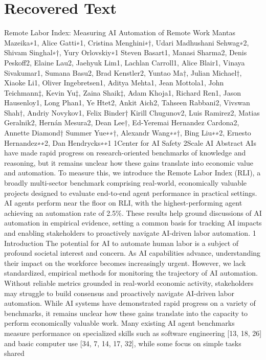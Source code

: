 \section{Recovered Text}
Remote Labor Index:
Measuring AI Automation of Remote Work
Mantas Mazeika∗1, Alice Gatti∗1, Cristina Menghini∗†,
Udari Madhushani Sehwag∗2, Shivam Singhal∗†, Yury Orlovskiy∗1
Steven Basart1, Manasi Sharma2, Denis Peskoff2, Elaine Lau2, Jaehyuk Lim1,
Lachlan Carroll1, Alice Blair1, Vinaya Sivakumar1, Sumana Basu2, Brad Kenstler2,
Yuntao Ma†, Julian Michael†, Xiaoke Li1, Oliver Ingebretsen1, Aditya Mehta1,
Jean Mottola1, John Teichmann‡, Kevin Yu‡, Zaina Shaik‡, Adam Khoja1,
Richard Ren1, Jason Hausenloy1, Long Phan1, Ye Htet2, Ankit Aich2,
Tahseen Rabbani2, Vivswan Shah†, Andriy Novykov1, Felix Binder†
Kirill Chugunov2, Luis Ramirez2, Matias Geralnik2, Hernán Mesura2,
Dean Lee†, Ed-Yeremai Hernandez Cardona2, Annette Diamond†
Summer Yue∗∗†, Alexandr Wang∗∗†,
Bing Liu∗∗2, Ernesto Hernandez∗∗2, Dan Hendrycks∗∗1
1Center for AI Safety
2Scale AI
Abstract
AIs have made rapid progress on research-oriented benchmarks of knowledge and
reasoning, but it remains unclear how these gains translate into economic value
and automation. To measure this, we introduce the Remote Labor Index (RLI),
a broadly multi-sector benchmark comprising real-world, economically valuable
projects designed to evaluate end-to-end agent performance in practical settings. AI
agents perform near the floor on RLI, with the highest-performing agent achieving
an automation rate of 2.5\%. These results help ground discussions of AI automation
in empirical evidence, setting a common basis for tracking AI impacts and enabling
stakeholders to proactively navigate AI-driven labor automation.
1
Introduction
The potential for AI to automate human labor is a subject of profound societal interest and concern.
As AI capabilities advance, understanding their impact on the workforce becomes increasingly urgent.
However, we lack standardized, empirical methods for monitoring the trajectory of AI automation.
Without reliable metrics grounded in real-world economic activity, stakeholders may struggle to build
consensus and proactively navigate AI-driven labor automation.
While AI systems have demonstrated rapid progress on a variety of benchmarks, it remains unclear
how these gains translate into the capacity to perform economically valuable work. Many existing
AI agent benchmarks measure performance on specialized skills such as software engineering
[13, 18, 26] and basic computer use [34, 7, 14, 17, 32], while some focus on simple tasks shared
